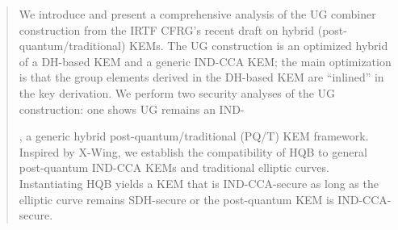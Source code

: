 \begin{abstract}
    We introduce and present a comprehensive analysis of the UG combiner construction from the IRTF CFRG's recent draft on hybrid (post-quantum/traditional) KEMs. The UG construction is an optimized hybrid of a DH-based KEM and a generic IND-CCA KEM; the main optimization is that the group elements derived in the DH-based KEM are ``inlined'' in the key derivation. We perform two security analyses of the UG construction: one shows UG remains an IND-
    
    
    
    , a generic
    hybrid post-quantum/traditional (PQ/T) KEM framework.  Inspired by
    X-Wing, we establish the compatibility of HQB to general post-quantum
    IND-CCA KEMs and traditional elliptic curves. Instantiating HQB yields a
    KEM that is IND-CCA-secure as long as the elliptic curve remains
    SDH-secure or the post-quantum KEM is IND-CCA-secure.
\end{abstract}
